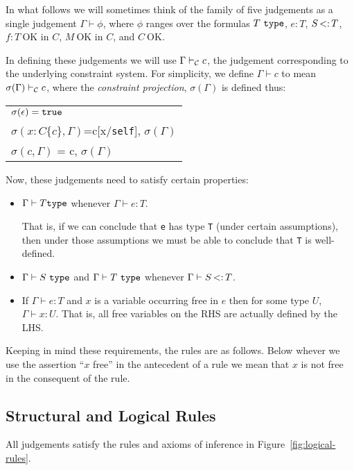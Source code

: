 \documentclass[preprint,nocopyrightspace,9pt]{sigplanconf}
\def\self{\mbox{\tt self}}
\def\type{\mbox{\tt type}}
\begin{document}
In what follows we will sometimes think of the family of five
judgements as a single judgement $\Gamma \vdash \phi$, where $\phi$
ranges over the formulas $T\ \tt type$, $e:T$, $S \subtype T$, $f:T\
\mbox{OK in $C$}$, $M\ \mbox{OK in $C$}$, and $C\ \mbox{OK}$.

In defining these judgements we will use $\Gamma \vdash_{\cal C} c$,
the judgement corresponding to the underlying constraint system. For simplicity,
we define $\Gamma \vdash c$ to mean $\sigma(\Gamma)\vdash_{\cal C} c$,
where the {\em constraint projection}, $\sigma(\Gamma)$ is defined thus:

\begin{tabular}{l}
$\sigma(\epsilon)={\tt true}$\\
$\sigma(x:C\{c\}, \Gamma)$=c[x/\self], $\sigma(\Gamma)$\\
$\sigma(c,\Gamma)$ = c, $\sigma(\Gamma)$
\end{tabular}

Now, these judgements need to satisfy certain properties:
\begin{itemize}
  \item $\Gamma \vdash T {\tt type}$ whenever $\Gamma \vdash e:T$. 

That is, if we can conclude that {\tt e} has type {\tt T} (under
certain assumptions), then under those assumptions we must be able to
conclude that {\tt T} is well-defined.

\item $\Gamma \vdash S\ \type$ and $\Gamma \vdash T\ \type$ whenever $\Gamma \vdash
S \subtype T$.
\item If $\Gamma \vdash e:T$ and $x$ is a variable occurring free in
$e$ then for some type $U$, $\Gamma \vdash x:U$. That is, all free
variables on the RHS are actually defined by the LHS.
\end{itemize}

Keeping in mind these requirements, the rules are as follows. Below
whever we use the assertion 
``$x$ free'' in the antecedent of a rule we
mean that $x$ is not free in the consequent of the rule.

\subsection{Structural and Logical Rules} 

All judgements satisfy the rules and axioms of inference in
Figure~\ref{fig:logical-rules}.
\end{document}
